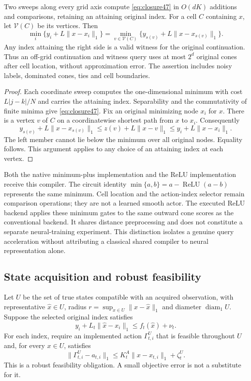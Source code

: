 \begin{proposition}\label{prop:compiler47}
Two sweeps along every grid axis compute \eqref{eq:closure47} in $O(dK)$ additions and comparisons, retaining an attaining original index. For a cell $C$ containing $x$, let $\mathcal V(C)$ be its vertices. Then
\begin{equation}\label{eq:corner47}
 \min_i\{y_i+L\|x-x_i\|_1\}
 =\min_{v\in\mathcal V(C)}
       \{y_{s(v)}+L\|x-x_{s(v)}\|_1\}.
\end{equation}
Any index attaining the right side is a valid witness for the original continuation. Thus an off-grid continuation and witness query uses at most $2^d$ original cones after cell location, without approximation error. The assertion includes noisy labels, dominated cones, ties and cell boundaries.
\end{proposition}
\begin{proof}
Each coordinate sweep computes the one-dimensional minimum with cost $L|j-k|/N$ and carries the attaining index. Separability and the commutativity of finite minima give \eqref{eq:closure47}. Fix an original minimizing node $x_i$ for $x$. There is a vertex $v$ of $C$ on a coordinatewise shortest path from $x$ to $x_i$. Consequently
\[
 y_{s(v)}+L\|x-x_{s(v)}\|_1
 \le z(v)+L\|x-v\|_1
 \le y_i+L\|x-x_i\|_1.
\]
The left member cannot lie below the minimum over all original nodes. Equality follows. This argument applies to any choice of an attaining index at each vertex.
\end{proof}

Both the native minimum-plus implementation and the ReLU implementation receive this compiler. The circuit identity $\min\{a,b\}=a-\operatorname{ReLU}(a-b)$ represents the same minimum. Cell location and the action-index selector remain comparison operations; they are not a learned smooth actor. The executed ReLU backend applies these minimum gates to the same outward cone scores as the conventional backend. It shares distance preprocessing and does not constitute a separate neural-training experiment. This distinction isolates a genuine query acceleration without attributing a classical shared compiler to neural representation alone.

\subsection{State acquisition and robust feasibility}
Let $U$ be the set of true states compatible with an acquired observation, with representative $\widehat x\in U$, radius $r=\sup_{x\in U}\|x-\widehat x\|_1$ and diameter $\operatorname{diam}_1 U$. Suppose the selected original index satisfies
\[
 y_i+L_t\|\widehat x-x_i\|_1\le f_t(\widehat x)+\nu_t.
\]
For each index, require an implemented action $\Gamma^U_{t,i}$ that is feasible throughout $U$ and, for every $x\in U$, satisfies
\begin{equation}\label{eq:robustrepair47}
 \|\Gamma^U_{t,i}-a_{t,i}\|_1
 \le K_t^A\|x-x_{t,i}\|_1+\zeta_t^U.
\end{equation}
This is a robust feasibility obligation. A small objective error is not a substitute for it.

